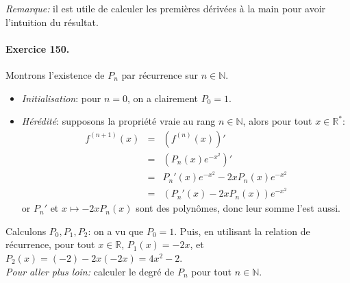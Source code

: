 \textit{Remarque:} il est utile de calculer les premières dérivées à la main pour avoir l'intuition du résultat.

\paragraph{Exercice 150.} Montrons l'existence de $P_n$ par récurrence sur $n\in\mathbb{N}$.
\begin{itemize}
  \item \textit{Initialisation}: pour $n=0$, on a clairement $P_0=1$.
  \item \textit{Hérédité}: supposons la propriété vraie au rang $n\in \mathbb{N}$, alors pour tout $x \in \mathbb{R}^*$:
  \begin{eqnarray}
    f^{(n+1)}(x) &=& \left( f^{(n)}(x) \right)'  \nonumber \\
                &=& \left( P_n(x)e^{-x^2} \right)'  \nonumber \\
                &=& P_n'(x)e^{-x^2}-2xP_n(x)e^{-x^2}  \nonumber \\
                &=& \left( P_n'(x) - 2xP_n(x) \right)e^{-x^2} \nonumber 
  \end{eqnarray}
  or $P_n'$ et $x\mapsto-2xP_n(x)$ sont des polynômes, donc leur somme l'est aussi.
\end{itemize}
Calculons $P_0,P_1,P_2$: on a vu que $P_0=1$. Puis, en utilisant la relation de récurrence, pour tout $x\in\mathbb{R}$, $P_1(x)=-2x$, et $P_2(x)=(-2)-2x(-2x)=4x^2-2$.\\

\textit{Pour aller plus loin:} calculer le degré de $P_n$ pour tout $n\in\mathbb{N}$.
